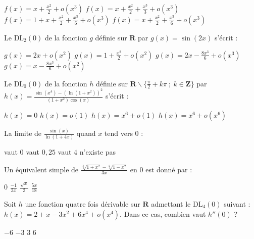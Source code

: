 \documentclass{exam}[5pts]
\begin{document}
\begin{questions}
\begin{choices}
 \choice $f(x) =  x + \frac{x^2}{2} + o(x^3)$ 
 \choice $f(x) =  x + \frac{x^2}{2} + \frac{x^3}{3} + o(x^3)$
 \choice $f(x) =  1 + x + \frac{x^2}{2} + \frac{x^3}{6} + o(x^3)$
 \choice $f(x) =  x + \frac{x^2}{2} + \frac{x^3}{6} + o(x^3)$
\end{choices}


\newpage


\question Le DL$_2(0)$ de la fonction $g$ définie sur $\mathbf{R}$ par $g(x) = \sin(2x)$ s'écrit :

\begin{choices}
 \choice $g(x) =  2x + o(x^2)$ 
 \choice $g(x) =  1 + \frac{x^2}{2} + o(x^2)$
 \choice $g(x) =  2x - \frac{8x^3}{6} + o(x^3)$
 \choice $g(x) =  x - \frac{8x^3}{6} + o(x^2)$
\end{choices}

\question Le DL$_0(0)$ de la fonction $h$ définie sur $\mathbf{R} \backslash \{ \frac{\pi}{2}+k\pi \ ; \ k \in \mathbf{Z} \}$ par $\displaystyle h(x) = \frac{\sin(x^4)-\left( \ln(1+x^2) \right)^2}{(1+x^2)\cos(x)}$ s'écrit :

\begin{choices}
 \choice $h(x) =  0$ 
 \choice $h(x) =  o(1)$
 \choice $h(x) =  x^6 + o(1)$
 \choice $h(x) =  x^6 + o(x^6)$
\end{choices}

\question La limite de $\frac{\sin(x)}{\ln(1+4x)}$ quand $x$ tend vers $0$ :

\begin{oneparchoices}
 \choice vaut $0$
 \choice vaut $0,25$
 \choice vaut $4$
 \choice n'existe pas
\end{oneparchoices}

\question Un équivalent simple de $\displaystyle \frac{\sqrt[3]{1+x^2}-\sqrt[2]{1-x^2}}{3x}$ en $0$ est donné par :

\begin{oneparchoices}
 \choice $0$
 \choice $\frac{-1}{3x}$
 \choice $\frac{\sqrt{x}}{3}$
 \choice $\frac{5x}{18}$
\end{oneparchoices}

\question Soit $h$ une fonction quatre fois dérivable sur $\mathbf{R}$ admettant le DL$_4(0)$ suivant : $h(x) =  2 + x - 3x^2 + 6x^4 + o(x^4)$. Dans ce cas, combien vaut $h''(0)$ ?

\begin{oneparchoices}
 \choice $-6$
 \choice $-3$
 \choice $3$
 \choice $6$
\end{oneparchoices}


\end{questions}
\end{document}
